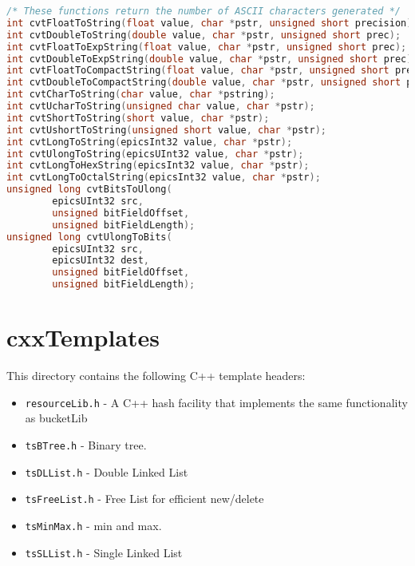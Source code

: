 \begin{lstlisting}[language=C]
/* These functions return the number of ASCII characters generated */
int cvtFloatToString(float value, char *pstr, unsigned short precision);
int cvtDoubleToString(double value, char *pstr, unsigned short prec);
int cvtFloatToExpString(float value, char *pstr, unsigned short prec);
int cvtDoubleToExpString(double value, char *pstr, unsigned short prec);
int cvtFloatToCompactString(float value, char *pstr, unsigned short prec);
int cvtDoubleToCompactString(double value, char *pstr, unsigned short prec);
int cvtCharToString(char value, char *pstring);
int cvtUcharToString(unsigned char value, char *pstr);
int cvtShortToString(short value, char *pstr);
int cvtUshortToString(unsigned short value, char *pstr);
int cvtLongToString(epicsInt32 value, char *pstr);
int cvtUlongToString(epicsUInt32 value, char *pstr);
int cvtLongToHexString(epicsInt32 value, char *pstr);
int cvtLongToOctalString(epicsInt32 value, char *pstr);
unsigned long cvtBitsToUlong(
        epicsUInt32 src,
        unsigned bitFieldOffset,
        unsigned bitFieldLength);
unsigned long cvtUlongToBits(
        epicsUInt32 src,
        epicsUInt32 dest,
        unsigned bitFieldOffset,
        unsigned bitFieldLength);
\end{lstlisting}

\section{cxxTemplates}

This directory contains the following C++ template headers:

\begin{itemize}
\item \verb|resourceLib.h| - A C++ hash facility that implements the same functionality as bucketLib

\item \verb|tsBTree.h| - Binary tree.

\item \verb|tsDLList.h| - Double Linked List

\item \verb|tsFreeList.h| - Free List for efficient new/delete

\item \verb|tsMinMax.h| - min and max.

\item \verb|tsSLList.h| - Single Linked List

\end{itemize}

